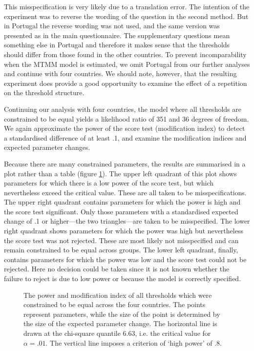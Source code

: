 \documentclass[a4paper,12pt]{article}
\begin{document}
This misspecification is very likely due to a translation error. The intention of the experiment was to reverse the wording of the question in the second method. But in Portugal the reverse wording was not used, and the same version was presented as in the main questionnaire. The supplementary questions mean something else in Portugal and therefore it makes sense that the thresholds should differ from those found in the other countries. To prevent incomparability when the MTMM model is estimated, we omit Portugal from our further analyses and continue with four countries. We should note, however, that the resulting experiment does provide a good opportunity to examine the effect of a repetition on the threshold structure.

Continuing our analysis with four countries, the model where all thresholds are constrained to be equal yields a likelihood ratio of 351 and 36 degrees of freedom. We again approximate the power of the score test (modification index) to detect a standardised difference of at least .1, and examine the modification indices and expected parameter changes. 

Because there are many constrained parameters, the results are summarised in a plot rather than a table (figure \ref{fig:modindices}). The upper left quadrant of this plot shows parameters for which there is a low power of the score test, but which nevertheless exceed the critical value. These are all taken to be misspecifications. The upper right quadrant contains parameters for which the power is high and the score test significant. Only those parameters with a standardised expected change of .1 or higher—the two triangles—are taken to be misspecified. The lower right quadrant shows parameters for which the power was high but nevertheless the score test was not rejected. These are most likely not misspecified and can remain constrained to be equal across groups. The lower left quadrant, finally, contains parameters for which the power was low and the score test could not be rejected. Here no decision could be taken since it is not known whether the failure to reject is due to low power or because the model is correctly specified.

\begin{figure}\caption{The power and modification index of all thresholds which were constrained to be equal across the four countries. The points represent parameters, while the size of the point is determined by the size of the expected parameter change. The horizontal line is drawn at the chi-square quantile 6.63, i.e. the critical value for $\alpha=.01$. The vertical line imposes a criterion of ‘high power’ of .8.\label{fig:modindices}}
\end{figure}
\end{document}

